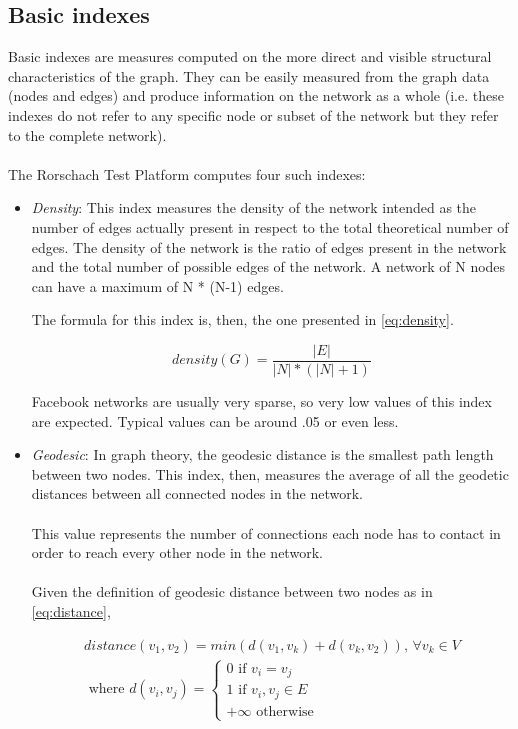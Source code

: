 \subsection{Basic indexes}
Basic indexes are measures computed on the more direct and visible structural characteristics of the graph.
They can be easily measured from the graph data (nodes and edges) and produce information on the network as a whole
(i.e. these indexes do not refer to any speciﬁc node or subset of the network but they refer to the complete network).\\
\\
The Rorschach Test Platform computes four such indexes:

\begin{itemize}

\item \emph{Density}: This index measures the density of the network intended as the number of edges actually present in respect to the total theoretical number of edges.
The density of the network is the ratio of edges present in the network and the total number of possible edges of the network.
A network of N nodes can have a maximum of N * (N-1) edges.

The formula for this index is, then, the one presented in \ref{eq:density}.

\begin{equation}
density(G) = 
\frac{\left | E \right |}
{\left | N \right | * \left ( \left | N \right | + 1 \right )}
\label{eq:density}
\end{equation}

Facebook networks are usually very sparse, so very low values of this index are expected.
Typical values can be around .05 or even less.

\item \emph{Geodesic}: In graph theory, the geodesic distance is the smallest path length between two nodes.
This index, then, measures the average of all the geodetic distances between all connected nodes in the network.\\
\\
This value represents the number of connections each node has to contact in order to reach every other node in the network.\\
\\
Given the deﬁnition of geodesic distance between two nodes as in \ref{eq:distance},

\begin{equation}
\begin{split}
distance(v_{1}, v_{2}) = min\left ( d(v_{1}, v_{k}) + d(v_{k}, v_{2}) \right )
\textrm{, } \forall v_{k} \in V \\
\textrm{ where }
d(v_{i}, v_{j})=\left \{
\begin{matrix}
0 \textrm{ if } v_{i} = v_{j} \\
1 \textrm{ if } v_{i}, v_{j} \in E \\
+\infty \textrm{ otherwise}
\end{matrix}
\right.
\end{split}
\label{eq:distance}
\end{equation}


\end{itemize}
